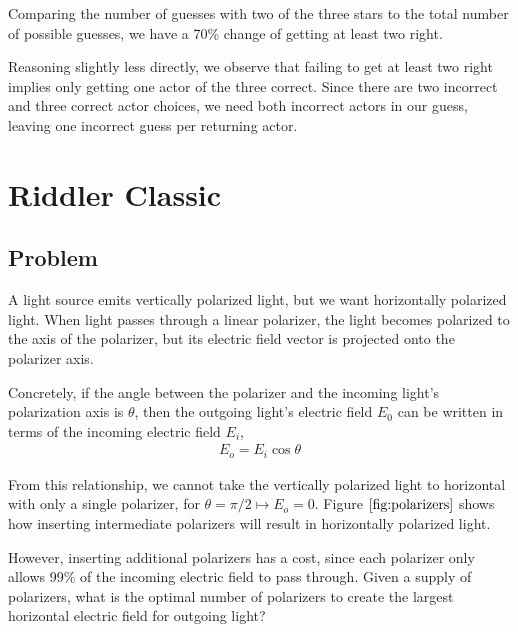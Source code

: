 \documentclass[reqno]{amsart}
\begin{document}
Comparing the number of guesses with two of the three stars to the total number of possible guesses, we have a 70\% change of getting at least two right. 

Reasoning slightly less directly, we observe that failing to get at least two right implies only getting one actor of the three correct. Since there are two incorrect and three correct actor choices, we need both incorrect actors in our guess, leaving one incorrect guess per returning actor.  

\section{Riddler Classic}

\subsection*{Problem}

A light source emits vertically polarized light, but we want horizontally polarized light. When light passes through a linear polarizer, the light becomes polarized to the axis of the polarizer, but its electric field vector is projected onto the polarizer axis. 

Concretely, if the angle between the polarizer and the incoming light's polarization axis is $\theta$, then the outgoing light's electric field $E_0$ can be written in terms of the incoming electric field $E_i$,
\begin{align*}
E_o = E_i \cos\theta
\end{align*} 

From this relationship, we cannot take the vertically polarized light to horizontal with only a single polarizer, for $\theta=\pi/2 \mapsto E_o=0$. Figure $\ref{fig:polarizers}$ shows how inserting intermediate polarizers will result in horizontally polarized light. 

However, inserting additional polarizers has a cost, since each polarizer only allows 99\% of the incoming electric field to pass through. Given a supply of polarizers, what is the optimal number of polarizers to create the largest horizontal electric field for outgoing light?
\end{document}
